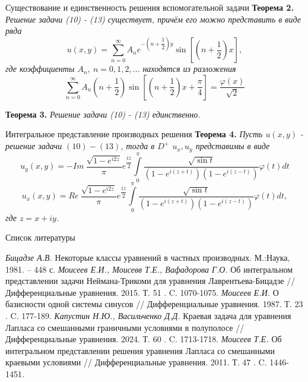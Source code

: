 \documentclass[10pt,pdf,hyperref={unicode}]{beamer}
\begin{document}
\begin{frame}{Существование и единственность решения вспомогательной задачи}
	\textbf{Теорема 2.} \textit{	Решение задачи (10) - (13) существует, причём его можно представить в виде ряда
		\begin{equation}
			u(x,y) = \sum\limits_{n=0}^{\infty} A_n e^{-\left(n + \dfrac12\right)y} \sin{\left[\left(n + \dfrac12\right)x\right]},
		\end{equation}
		где коэффициенты $A_n, \ n =0,1,2, \dots$ находятся из разложения
		\begin{equation}
			\sum\limits_{n=0}^{\infty} A_n \left(n + \dfrac12 \right) \sin{\left[\left(n +\dfrac12\right)x + \dfrac\pi4\right]} = \dfrac{\varphi(x)}{\sqrt2}
	\end{equation}}
	
	\textbf{Теорема 3.} \textit{Решение задачи (10) - (13) единственно.}
\end{frame}
\begin{frame} {Интегральное представление производных решения}
	\textbf{Теорема 4.} \textit{	Пусть $u(x,y)$ - решение задачи $(10)-(13)$, тогда в $D^+$ $u_x, u_y$ представимы в виде
		\begin{equation}
			u_y(x,y) = - Im\  \dfrac{ \sqrt{1 - e^{i2z}} }{\pi} e^{\dfrac{iz}{2}} \int\limits_0^\pi  \dfrac{\sqrt{\sin{t}}}{\left(1 - e^{i(z+t)} \right) \left(1 - e^{i(z-t)}\right)}  \varphi(t) dt
		\end{equation}
		\begin{equation}
			u_x(x,y) = Re\   \dfrac{ \sqrt{1 - e^{i2z}} }{\pi} e^{\dfrac{iz}{2}} \int\limits_0^\pi  \dfrac{\sqrt{\sin{t}}}{\left(1 - e^{i(z+t)} \right) \left(1 - e^{i(z-t)}\right)}  \varphi(t) dt,
	\end{equation}
	где $z = x + iy$.
}
	
\end{frame}
\begin{frame}{Список литературы}
\begin{thebibliography}{30}
	{\it Бицадзе А.В.} Некоторые классы уравнений в частных производных. М.:Наука, 1981. -- 448 с.
	{\it Моисеев Е.И., Моисевв Т.Е., Вафадорова Г.О.} Об интегральном представлении задачи Неймана-Трикоми для уравнения Лаврентьева-Бицадзе // Дифференциальные уравнения. 2015. Т. 51 . C. 1070-1075.
	{\it Моисеев Е.И.} О базисности одной системы синусов // Дифференциальные уравнения. 1987. Т. 23 . C. 177-189.
	{\it Капустин Н.Ю., Васильченко Д.Д.} Краевая задача для уравнения Лапласа со смешанными граничными условиями в полуполосе // Дифференциальные уравнения. 2024. Т. 60 . C. 1713-1718.
	{\it Моисеев Т.Е.} Об интегральном представлении решения уравнения Лапласа со смешанными краевыми условиями // Дифференциальные уравнения. 2011. Т. 47 . C. 1446-1451.
\end{thebibliography}
\end{frame}
\end{document}
